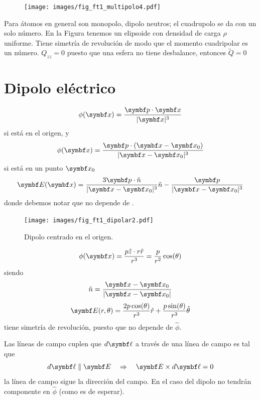 \documentclass[10pt,oneside]{CBFT_book}
\begin{document}
\begin{figure}[htb]
	\begin{center}
	\texttt{[image: images/fig\_ft1\_multipolo4.pdf]}	 
	\end{center}
	\caption{}
\end{figure}

Para átomos en general son monopolo, dipolo neutros; el cuadrupolo se da con un solo número. 
En la Figura tenemos un elipsoide con densidad de carga $\rho$ uniforme. Tiene simetría de revolución
de modo que el momento cuadripolar es un número. $Q_{zz} = 0 $ puesto que una esfera no tiene
desbalance, entonces $\overleftrightarrow{Q} = 0 $ 


\section{Dipolo eléctrico}

\[
	\phi(\vb{x}) = \frac{ \vb{p}\cdot\vb{x} }{|\vb{x}|^3} 
\]
si está en el origen, y
\[
	\phi(\vb{x}) = \frac{ \vb{p}\cdot(\vb{x}-\vb{x}_0) }{|\vb{x} - \vb{x}_0|^3} 
\]
si está en un punto $\vb{x}_0$
\[
	\vb{E}(\vb{x}) = \frac{3 \vb{p}\cdot\hat{n} }{|\vb{x} - \vb{x}_0|^3}  \hat{n} - 
		\frac{ \vb{p} }{|\vb{x} - \vb{x}_0|^3}	
\]
donde debemos notar que  no depende de .

\begin{figure}[htb]
	\begin{center}
	\texttt{[image: images/fig\_ft1\_dipolar2.pdf]}	 
	\end{center}
	\caption{Dipolo centrado en el origen.}
\end{figure}

\[
	\phi(\vb{x}) = \frac{p\hat{z}\cdot r\hat{r}}{r^3} = \frac{p}{r^2} \cos(\theta)
\]
siendo 
\[
	\hat{n} = \frac{\vb{x}-\vb{x}_0}{|\vb{x}-\vb{x}_0|}
\]
\[
	\vb{E}(r,\theta) = \frac{2 p\cos(\theta)}{r^3} \hat{r} + \frac{p\sin(\theta)}{r^3} \hat{\theta}
\]
tiene simetría de revolución, puesto que no depende de $\hat{\phi}$.

Las líneas de campo cuplen que $d\vb{\ell}$ a través de una línea de campo es tal que 
\[
	d\vb{\ell} \parallel \vb{E} \quad \Rightarrow \quad  \vb{E} \times d\vb{\ell}  = 0
\]
la línea de campo sigue la dirección del campo. En el caso del dipolo no tendrán componente en
$\hat{\phi}$ (como es de esperar).
\end{document}

